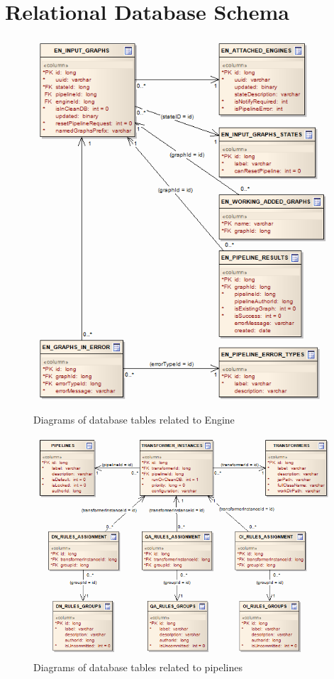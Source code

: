 \chapter{Relational Database Schema}
\label{chap:reldb}

\begin{figure}[htbp]
    \centering
    \includegraphics[scale=0.6]{images/db-engine.png}
    \caption{Diagrams of database tables related to Engine}
	\label{fig:dbEngine}
\end{figure}

\begin{figure}[htbp]
    \centering
    \includegraphics[scale=0.6]{images/db-pipelines.png}
    \caption{Diagrams of database tables related to pipelines}
	\label{fig:dbPipelines}
\end{figure}

